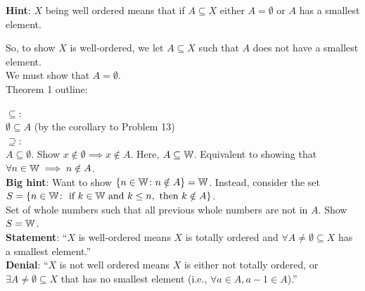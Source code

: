             \noindent \textbf{Hint}: \(X\) being well ordered means that if \(A \subseteq X\) either \(A = \emptyset\) or \(A\) has a smallest element.

            So, to show \(X\) is well-ordered, we let \(A\subseteq X\) such that \(A\) does not have a smallest element. \\

            We must show that \(A = \emptyset\). \\

            Theorem 1 outline:

            \(\subseteq\): \\
            \(\emptyset \subseteq A\) (by the corollary to Problem 13) \\

            \(\supseteq\): \\
            \(A \subseteq \emptyset\). Show \(x\notin \emptyset \implies x \notin A\). Here, \(A \subseteq \mathbb{W}\). Equivalent to showing that \(\forall n \in \mathbb{W} \implies n \notin A\). \\  

            \noindent \textbf{Big hint}: Want to show \(\{n \in \mathbb{W} \colon n \notin A\} = \mathbb{W}\). Instead, consider the set \(S = \{n \in \mathbb{W} \colon \text{ if } k \in \mathbb{W} \text{ and } k \leq n, \text{ then } k \notin A\}\). \\
            Set of whole numbers such that all previous whole numbers are not in \(A\). Show \(S = \mathbb{W}\). \\

            \textbf{Statement}: ``\(X\) is well-ordered means \(X\) is totally ordered and \(\forall A \ne \emptyset \subseteq X\) has a smallest element.'' \\
            \indent\textbf{Denial}: ``\(X\) is not well ordered means \(X\) is either not totally ordered, or \(\exists A \ne \emptyset \subseteq X\) that has no smallest element (i.e., \(\forall a \in A, a- 1 \in A\)).''